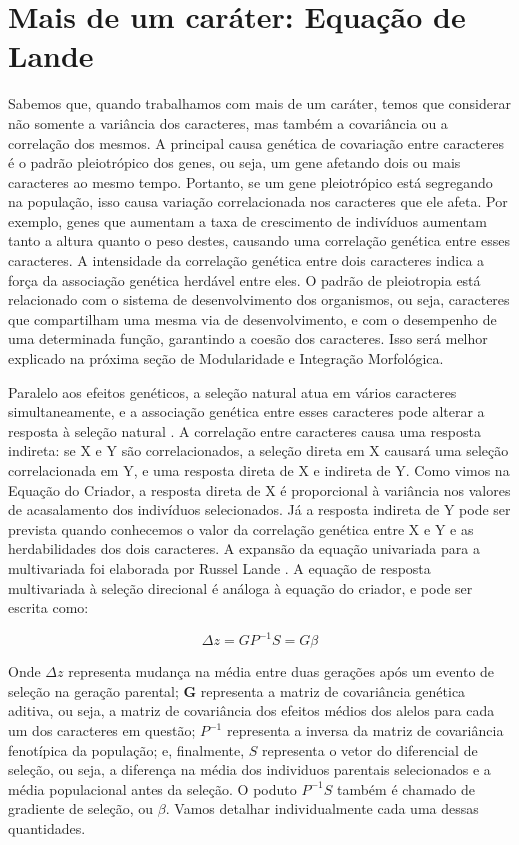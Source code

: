 \documentclass[portuges,]{tufte-handout}
\begin{document}
\section{Mais de um caráter: Equação de
Lande}\label{mais-de-um-caruxe1ter-equauxe7uxe3o-de-lande}

Sabemos que, quando trabalhamos com mais de um caráter, temos que
considerar não somente a variância dos caracteres, mas também a
covariância ou a correlação dos mesmos. A principal causa genética de
covariação entre caracteres é o padrão pleiotrópico dos genes, ou seja,
um gene afetando dois ou mais caracteres ao mesmo tempo. Portanto, se um
gene pleiotrópico está segregando na população, isso causa variação
correlacionada nos caracteres que ele afeta. Por exemplo, genes que
aumentam a taxa de crescimento de indivíduos aumentam tanto a altura
quanto o peso destes, causando uma correlação genética entre esses
caracteres. A intensidade da correlação genética entre dois caracteres
indica a força da associação genética herdável entre eles. O padrão de
pleiotropia está relacionado com o sistema de desenvolvimento dos
organismos, ou seja, caracteres que compartilham uma mesma via de
desenvolvimento, e com o desempenho de uma determinada função,
garantindo a coesão dos caracteres. Isso será melhor explicado na
próxima seção de Modularidade e Integração Morfológica.

Paralelo aos efeitos genéticos, a seleção natural atua em vários
caracteres simultaneamente, e a associação genética entre esses
caracteres pode alterar a resposta à seleção natural
\cite{Lande1983a}. A correlação entre caracteres causa uma resposta
indireta: se X e Y são correlacionados, a seleção direta em X causará
uma seleção correlacionada em Y, e uma resposta direta de X e indireta
de Y. Como vimos na Equação do Criador, a resposta direta de X é
proporcional à variância nos valores de acasalamento dos indivíduos
selecionados. Já a resposta indireta de Y pode ser prevista quando
conhecemos o valor da correlação genética entre X e Y e as
herdabilidades dos dois caracteres. A expansão da equação univariada
para a multivariada foi elaborada por Russel Lande \cite{Lande1979}.
A equação de resposta multivariada à seleção direcional é análoga à
equação do criador, e pode ser escrita como:

\[
\Delta z = GP^{-1}S = G\beta
\]

Onde $\Delta z$ representa mudança na média entre duas gerações após um
evento de seleção na geração parental; $\mathbf{G}$ representa a matriz
de covariância genética aditiva, ou seja, a matriz de covariância dos
efeitos médios dos alelos para cada um dos caracteres em questão;
$P^{-1}$ representa a inversa da matriz de covariância fenotípica da
população; e, finalmente, $S$ representa o vetor do diferencial de
seleção, ou seja, a diferença na média dos individuos parentais
selecionados e a média populacional antes da seleção. O poduto $P^{-1}S$
também é chamado de gradiente de seleção, ou $\beta$. Vamos detalhar
individualmente cada uma dessas quantidades.
\end{document}
